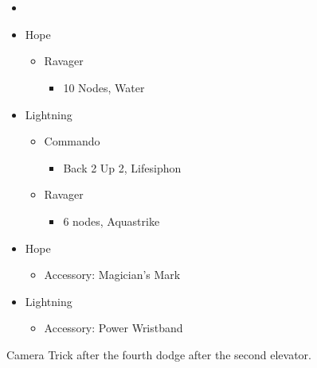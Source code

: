\chapter[Chapter 5]{}


\renewcommand{\first}{[1] Slash \& Burn (\rav/\com)}
\renewcommand{\second}{[2] War \& Peace (\med/\com)}
\renewcommand{\third}{[3] Supersoldier (\syn/\com)}
\renewcommand{\fourth}{[4] Dualcasting (\rav/\rav)}
\renewcommand{\fifth}{[5] Dualcasting (\rav/\rav)}
\renewcommand{\sixth}{[6] Slash \& Burn (\rav/\com)}
\begin{multicols}{2}
\begin{menu}
\begin{itemize}
    \paradigm
    \begin{itemize}
        \item {}%
{\paradigmline[1]{\textit{\rav}}{\textit{\com}}{}}%
{\paradigmline{(\med)}{(\com)}{}}%
{\paradigmline{\syn}{\com}{}}%
{\paradigmline{\rav}{\rav}{}}%
{\paradigmline{\rav}{[\rav]}{}}%
{\paradigmline{[\rav]}{\com}{}}
    \end{itemize}
    \crystarium
    \begin{itemize}
        \item Hope
        \begin{itemize}
            \item Ravager
            \begin{itemize}
                \item 10 Nodes, Water
            \end{itemize}
        \end{itemize}
        \item Lightning
        \begin{itemize}
            \item Commando
            \begin{itemize}
                \item Back 2 Up 2, Lifesiphon
            \end{itemize}
            \item Ravager
            \begin{itemize}
                \item 6 nodes, Aquastrike
            \end{itemize}
        \end{itemize}
    \end{itemize}
    \equip
    \begin{itemize}
       \item Hope
	\begin{itemize}
		\item Accessory: Magician's Mark
	\end{itemize}
        \item Lightning
        \begin{itemize}
            \item Accessory: Power Wristband
        \end{itemize}
    \end{itemize}
\end{itemize}
\end{menu}
Camera Trick after the fourth dodge after the second elevator.


\end{multicols}
